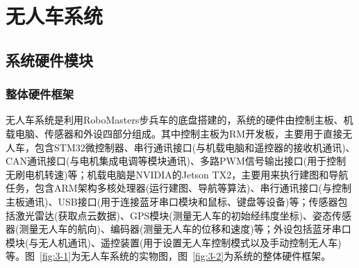 
\chapter{无人车系统}
\section{系统硬件模块}
\subsection{整体硬件框架}
无人车系统是利用RoboMasters步兵车的底盘搭建的，系统的硬件由控制主板、机载电脑、传感器和外设四部分组成。其中控制主板为RM开发板，主要用于直接无人车，包含STM32微控制器、串行通讯接口(与机载电脑和遥控器的接收机通讯)、CAN通讯接口(与电机集成电调等模块通讯)、多路PWM信号输出接口(用于控制无刷电机转速)等；机载电脑是NVIDIA的Jetson TX2，主要用来执行建图和导航任务，包含ARM架构多核处理器(运行建图、导航等算法)、串行通讯接口(与控制主板通讯)、USB接口(用于连接蓝牙串口模块和鼠标、键盘等设备)等；传感器包括激光雷达(获取点云数据)、GPS模块(测量无人车的初始经纬度坐标)、姿态传感器(测量无人车的航向)、编码器(测量无人车的位移和速度)等；外设包括蓝牙串口模块(与无人机通讯)、遥控装置(用于设置无人车控制模式以及手动控制无人车)等。图~\ref{fig:3-1}为无人车系统的实物图，图~\ref{fig:3-2}为系统的整体硬件框架。

